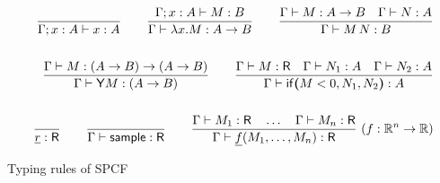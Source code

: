 \begin{figure*}[h]
\begin{align*}
  \frac{}{\Gamma ; x:A \vdash x:A} 
  \qquad
  \frac{\Gamma ; x:A \vdash M : B}{\Gamma \vdash \lambda x.M : A \to B} 
  \qquad
  \frac{\Gamma \vdash M:A \to B \quad \Gamma \vdash N : A}{\Gamma \vdash M \, N : B} 
  \\ \\
  \qquad
  \frac{\Gamma \vdash M : (A \to B) \to (A \to B)}{\Gamma \vdash \mathsf{Y} M : (A \to B)}
  \qquad
  \frac{\Gamma \vdash M : \textsf{R} \quad \Gamma \vdash N_1 : A \quad \Gamma \vdash N_2 : A}{\Gamma \vdash \mathsf{if}\boldsymbol{(}M < 0, N_1, N_2\boldsymbol{)} : A}    
  \\ \\
  \qquad
  \frac{}{\underline{r} : \textsf{R}} 
  \qquad
  \frac{}{\Gamma \vdash \mathsf{sample} : \textsf{R}}
  \qquad
  \frac{\Gamma \vdash M_1:\textsf{R} \quad \dots \quad \Gamma \vdash M_n:\textsf{R}}{\Gamma \vdash \underline{f}(M_1,\dots,M_n) : \textsf{R}} \ (f : \mathbb{R}^n \to \mathbb{R})
\end{align*}
\caption{Typing rules of SPCF \label{fig:typing rules}}
\end{figure*}

